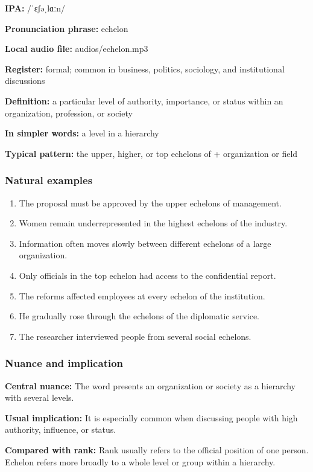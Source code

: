 \documentclass[11pt]{article}
\begin{document}
\textbf{IPA:} /ˈɛʃəˌlɑːn/

\textbf{Pronunciation phrase:} echelon

\textbf{Local audio file:} audios/echelon.mp3

\textbf{Register:} formal; common in business, politics, sociology, and institutional discussions

\textbf{Definition:} a particular level of authority, importance, or status within an organization, profession, or society

\textbf{In simpler words:} a level in a hierarchy

\textbf{Typical pattern:} the upper, higher, or top echelons of + organization or field

\subsubsection{Natural examples}
\begin{enumerate}
  \item The proposal must be approved by the upper echelons of management.
  \item Women remain underrepresented in the highest echelons of the industry.
  \item Information often moves slowly between different echelons of a large organization.
  \item Only officials in the top echelon had access to the confidential report.
  \item The reforms affected employees at every echelon of the institution.
  \item He gradually rose through the echelons of the diplomatic service.
  \item The researcher interviewed people from several social echelons.
\end{enumerate}

\subsubsection{Nuance and implication}
\textbf{Central nuance:} The word presents an organization or society as a hierarchy with several levels.

\textbf{Usual implication:} It is especially common when discussing people with high authority, influence, or status.

\textbf{Compared with rank:} Rank usually refers to the official position of one person. Echelon refers more broadly to a whole level or group within a hierarchy.
\end{document}
